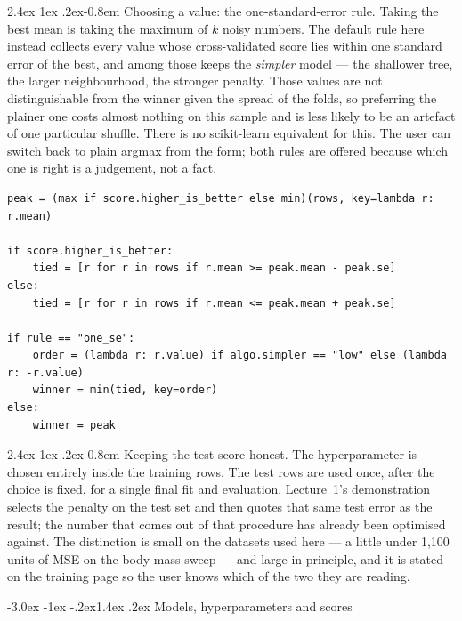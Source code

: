 \documentclass[11pt,a4paper]{article}
\makeatletter
\renewcommand\subsection{\@startsection{subsection}{2}{\z@}%
  {-3.0ex \@plus -1ex \@minus -.2ex}{1.4ex \@plus .2ex}%
  {\normalfont\large\sffamily\bfseries\color{accent}}}
\renewcommand\paragraph{\@startsection{paragraph}{4}{\z@}%
  {2.4ex \@plus1ex \@minus.2ex}{-0.8em}%
  {\normalfont\normalsize\sffamily\bfseries\color{code}}}
\makeatother
\begin{document}
\paragraph{Choosing a value: the one-standard-error rule.} Taking the best mean is
taking the maximum of $k$ noisy numbers. The default rule here instead collects
every value whose cross-validated score lies within one standard error of the
best, and among those keeps the \emph{simpler} model --- the shallower tree, the
larger neighbourhood, the stronger penalty. Those values are not distinguishable
from the winner given the spread of the folds, so preferring the plainer one costs
almost nothing on this sample and is less likely to be an artefact of one
particular shuffle. There is no scikit-learn equivalent for this. The user can
switch back to plain argmax from the form; both rules are offered because which
one is right is a judgement, not a fact.

\begin{lstlisting}
peak = (max if score.higher_is_better else min)(rows, key=lambda r: r.mean)

if score.higher_is_better:
    tied = [r for r in rows if r.mean >= peak.mean - peak.se]
else:
    tied = [r for r in rows if r.mean <= peak.mean + peak.se]

if rule == "one_se":
    order = (lambda r: r.value) if algo.simpler == "low" else (lambda r: -r.value)
    winner = min(tied, key=order)
else:
    winner = peak
\end{lstlisting}

\paragraph{Keeping the test score honest.} The hyperparameter is chosen entirely
inside the training rows. The test rows are used once, after the choice is fixed,
for a single final fit and evaluation. Lecture~1's demonstration selects the
penalty on the test set and then quotes that same test error as the result; the
number that comes out of that procedure has already been optimised against. The
distinction is small on the datasets used here --- a little under 1{,}100 units of
MSE on the body-mass sweep --- and large in principle, and it is stated on the
training page so the user knows which of the two they are reading.

\subsection{Models, hyperparameters and scores}
\end{document}
